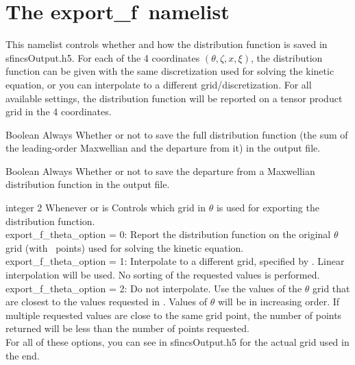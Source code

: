 \section{The {\ttfamily export\_f}~namelist}

This namelist controls whether and how the distribution function is saved in {\ttfamily sfincsOutput.h5}.
For each of the 4 coordinates $(\theta, \zeta, x, \xi)$, the distribution function can be given with the same discretization
used for solving the kinetic equation, or you can interpolate to a different grid/discretization.
For all available settings, the distribution function will be reported on a tensor product grid in the 4 coordinates.

\myhrule

{Boolean}
{\false}
{Always}
{Whether or not to save the full distribution function (the sum of the leading-order Maxwellian and the departure from it)
in the output file.}

\myhrule

{Boolean}
{\false}
{Always}
{Whether or not to save the departure from a Maxwellian distribution function in the output file.}

\myhrule

{integer}
{2}
{Whenever  or  is \true}
{Controls which grid in $\theta$ is used for exporting the distribution function.\\

{\ttfamily export\_f\_theta\_option} = 0: Report the distribution function on the original $\theta$ grid (with \Ntheta~points) used for solving the kinetic equation.\\

{\ttfamily export\_f\_theta\_option} = 1: Interpolate to a different grid, specified by . Linear interpolation will be used.
No sorting of the requested values is performed.\\

{\ttfamily export\_f\_theta\_option} = 2: Do not interpolate. Use the
values of the $\theta$ grid that are closest to the values requested
in .  Values of $\theta$ will be in
increasing order. If multiple requested values are close to the same
grid point, the number of points returned will be less than the number
of points requested. \\

For all of these options, you can see  in {\ttfamily sfincsOutput.h5} for the actual grid used in the end.
}

